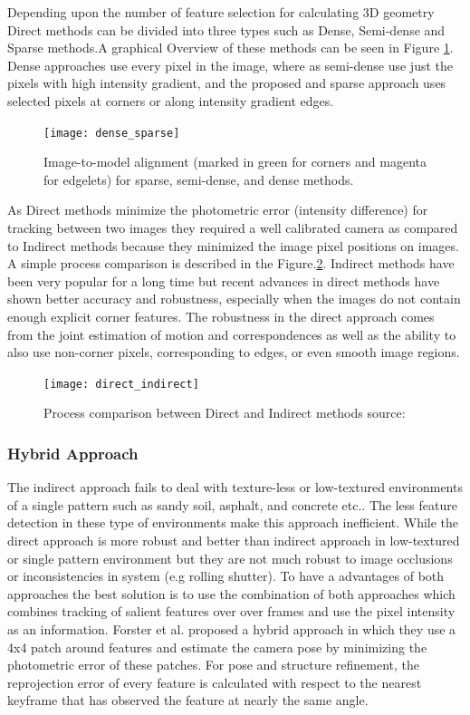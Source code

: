 Depending upon the number of feature selection for calculating 3D geometry Direct methods can be divided into three types such as Dense, Semi-dense and Sparse methods.A graphical Overview of these methods can be seen in Figure \ref{fig:dense_sparse}. Dense approaches use every pixel in the image, where as semi-dense use just the pixels with high intensity gradient, and the proposed and sparse approach uses selected pixels at corners or along intensity gradient edges.\cite{engel14eccv}

\begin{figure}[h]
	\centering
	\texttt{[image: dense\_sparse]}
	\caption{Image-to-model alignment (marked in green for corners and magenta for
		edgelets) for sparse, semi-dense, and dense methods. \cite{7782863} }
	\label{fig:dense_sparse}
\end{figure}

As Direct methods minimize the photometric error (intensity difference) for tracking between two images they required a well calibrated camera as compared to Indirect methods because they minimized the image pixel positions on images. A simple process comparison is described in the Figure.\ref{fig:direct_indirect}. Indirect methods have been very popular for a long time but recent advances in direct methods have shown better accuracy and robustness, especially when the images do not contain enough explicit corner features.\cite{Engel-et-al-pami2018} The robustness in the direct approach comes from the joint estimation of motion and correspondences as well as the ability to also use non-corner pixels, corresponding to edges, or even smooth image regions.\cite{gao2018ldso}

\begin{figure}[h]
	\centering
	\texttt{[image: direct\_indirect]}
	\caption{Process comparison between Direct and Indirect methods {source:\cite{engel14eccv}}}
	\label{fig:direct_indirect}
\end{figure}


\subsubsection{Hybrid Approach}
The indirect approach fails to deal with texture-less or low-textured environments of a single pattern such as sandy soil, asphalt, and concrete etc.. The less feature detection in these type of environments make this approach inefficient. While the direct approach is more robust and better than indirect approach in low-textured or single pattern environment but they are not much robust to image occlusions or inconsistencies in system (e.g rolling shutter). To have a advantages of both approaches the best solution is to use the combination of both approaches which combines tracking of salient features over over frames and use the pixel intensity as an information\cite{Aqel-et-al-2016}. Forster et al.\cite{7782863} proposed a hybrid approach in which they use a 4x4 patch around features and estimate the camera pose by minimizing the photometric error of these patches. For pose and structure refinement, the reprojection error of every feature is calculated with respect to the nearest keyframe that has observed the feature at nearly the same angle. \\

